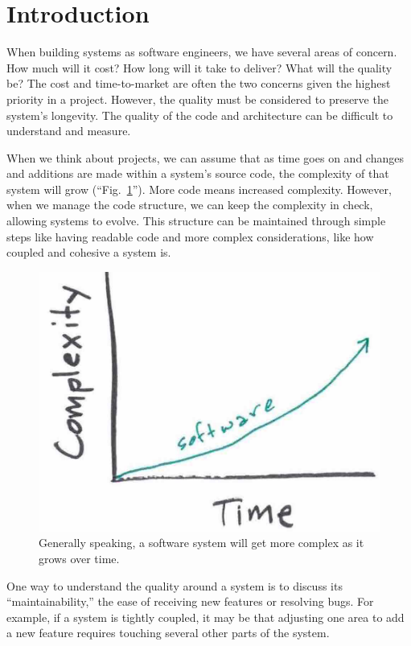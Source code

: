 \documentclass[12pt,conference]{IEEEtran}
\begin{document}
\section{Introduction}
\vspace{0.25cm}

When building systems as software engineers, we have several areas of concern. How much will it cost? How long will it take to deliver? What will the quality be? The cost and time-to-market are often the two concerns given the highest priority in a project. However, the quality must be considered to preserve the system's longevity. The quality of the code and architecture can be difficult to understand and measure.

When we think about projects, we can assume that as time goes on and changes and additions are made within a system's source code, the complexity of that system will grow (``Fig.~\ref{figTimeAndComplexity}''). More code means increased complexity. However, when we manage the code structure, we can keep the complexity in check, allowing systems to evolve. This structure can be maintained through simple steps like having readable code and more complex considerations, like how coupled and cohesive a system is.

\begin{figure}[ht]
    \centerline{
        \includegraphics[width=0.7\columnwidth]{TimeAndComplexity}
    }
    \caption{Generally speaking, a software system will get more complex as it grows over time.}
    \label{figTimeAndComplexity}
\end{figure}

One way to understand the quality around a system is to discuss its ``maintainability,'' the ease of receiving new features or resolving bugs. For example, if a system is tightly coupled, it may be that adjusting one area to add a new feature requires touching several other parts of the system.
\end{document}

